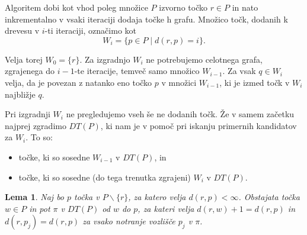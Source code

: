 \documentclass[a4paper, 12pt]{book}
\newtheorem{lema}[izrek]{Lema}
\begin{document}
Algoritem dobi kot vhod poleg množice $P$ izvorno točko $r\in P$ in nato inkrementalno v vsaki iteraciji dodaja točke h grafu. Množico točk, dodanih k drevesu v $i$-ti iteraciji, označimo kot
\[	W_i = \{ p\in P \mid d(r,p) = i\}.
	\]

Velja torej $W_0 = \{r\}$. Za izgradnjo $W_i$ ne potrebujemo celotnega grafa, zgrajenega do $i-1$-te iteracije, temveč samo množico $W_{i-1}$.  Za vsak $q\in W_i$ velja, da je povezan z natanko eno točko $p$ v množici $W_{i-1}$,  ki je izmed točk v $W_i$ najbližje $q$.

Pri izgradnji $W_i$ ne pregledujemo vseh še ne dodanih točk. Že v samem začetku najprej zgradimo $DT(P)$, ki nam je v pomoč pri iskanju primernih kandidatov za $W_i$. To so:

\begin{itemize}
\item točke, ki so sosedne $W_{i-1}$ v $DT(P)$, in
\item točke, ki so sosedne (do tega trenutka zgrajeni) $W_i$ v $DT(P)$.
\end{itemize} 

\begin{lema}
\label{lema1}
Naj bo $p$ točka v $P\backslash \{r\}$, za katero velja $d(r,p) < \infty$. Obstajata točka $w\in P$ in pot $\pi$ v $DT(P)$ od $w$ do $p$, za kateri velja $d(r,w)+1 = d(r,p)$ in $d(r,p_j) = d(r,p)$ za vsako notranje vozlišče $p_j$ v $\pi$.
\end{lema}
\end{document}
